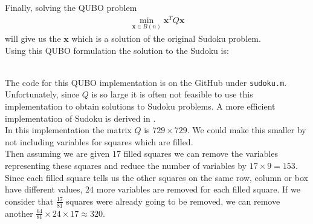 \documentclass{article}
\begin{document}
\noindent Finally, solving the QUBO problem
\begin{align*}
    \min_{\mathbf{x} \in B(n)} \mathbf{x}^T Q \mathbf{x}
\end{align*}
will give us the \(\mathbf{x}\) which is a solution of the original Sudoku problem.\\

\noindent Using this QUBO formulation the solution to the Sudoku is:

\hspace{92pt}\begin{lpsudoku}[scale=0.5]
\end{lpsudoku}\\

\noindent The code for this QUBO implementation is on the GitHub under \texttt{sudoku.m}.\\
 
\noindent Unfortunately, since \(Q\) is so large it is often not feasible to use this implementation to obtain solutions to Sudoku problems. A more efficient implementation of Sudoku is derived in \cite{mücke2024sudoku}.\\

\noindent In this implementation the matrix \(Q\) is \(729 \times 729\). We could make this smaller by not including variables for squares which are filled. \\ 
Then assuming we are given \(17\) filled squares we can remove the variables representing these squares and reduce the number of variables by \(17 \times 9 = 153\).\\
Since each filled square tells us the other squares on the same row, column or box have different values, \(24\) more variables are removed for each filled square. If we consider that \(\frac{17}{81}\) squares were already going to be removed, we can remove another \(\frac{64}{81} \times 24 \times 17 \approx 320\).\\
\end{document}
